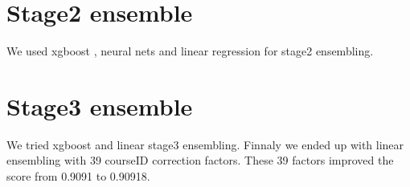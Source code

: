 \section{Stage2 ensemble}
We used xgboost \cite{xgboost}, neural nets and linear regression for stage2 ensembling.

\section{Stage3 ensemble}
We tried xgboost and linear stage3 ensembling.
Finnaly we ended up with linear ensembling with 39 courseID correction factors.
These 39 factors improved the score from 0.9091 to 0.90918.